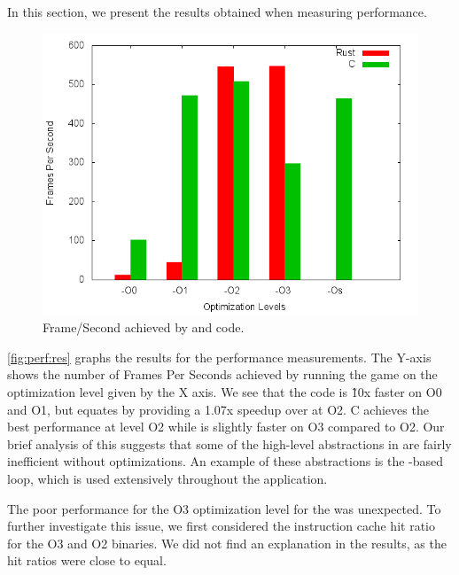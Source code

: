 In this section, we present the results obtained when measuring performance.

\begin{figure}[H]
  \begin{center}
    \includegraphics[scale=0.5]{results/plots/perf/perf.png}
  \end{center}
  \caption{Frame/Second achieved by {\rust} and {\C} code.}
  \label{fig:perf:res}
\end{figure}

\autoref{fig:perf:res} graphs the results for the performance measurements.
The Y-axis shows the number of Frames Per Seconds achieved by running the game on the optimization level given by the X axis.
We see that the {\C} code is \~10x faster on O0 and O1, but {\rust} equates by providing a 1.07x speedup over {\C} at O2.
C achieves the best performance at level O2 while {\rust} is slightly faster on O3 compared to O2.
Our brief analysis of this suggests that some of the high-level abstractions in {\rust} are fairly inefficient without optimizations.
An example of these abstractions is the -based  loop, which is used extensively throughout the {\cg} application.

The poor performance for the O3 optimization level for the {\C} was unexpected.
To further investigate this issue, we first considered the instruction cache hit ratio for the O3 and O2 binaries.
We did not find an explanation in the results, as the hit ratios were close to equal.

